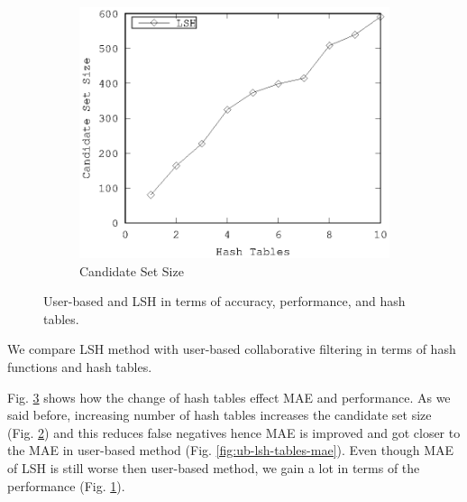 \documentclass[conference]{IEEEtran}
\begin{document}
\begin{figure}[!h]
\begin{subfigure}[b]{0.225\textwidth}
                \label{fig:ub-lsh-tables-runtime}
        \end{subfigure} 
        \\
         \begin{subfigure}[b]{0.225\textwidth}
                \includegraphics[width=\textwidth]{charts/lsh-canidate-hash-tables.eps}
                \caption{Candidate Set Size}
                \label{fig:lsh-tables-candidate-size}
        \end{subfigure} 
        \caption{User-based and LSH in terms of accuracy, performance, and hash tables.}
        \label{fig:ub-lsh-tables}
\end{figure}

We compare LSH method with user-based collaborative filtering in terms of hash 
functions and hash tables. 

Fig. \ref{fig:ub-lsh-tables} shows how the change of 
hash tables effect MAE and performance. As we said before, increasing number of 
hash tables increases the candidate set size (Fig. \ref{fig:lsh-tables-candidate-size}) 
and this reduces false negatives hence MAE is improved and got closer to the MAE in 
user-based method (Fig. \ref{fig:ub-lsh-tables-mae}). Even though MAE of LSH 
is still worse then user-based method, we gain a lot in terms of the performance 
(Fig. \ref{fig:ub-lsh-tables-runtime}).
\end{document}
